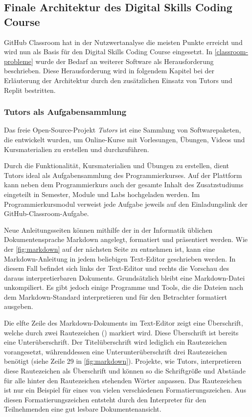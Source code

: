 \subsection{Finale Architektur des Digital Skills Coding Course}
GitHub Classroom hat in der Nutzwertanalyse die meisten Punkte erreicht und wird
nun als Basis für den Digital Skills Coding Course eingesetzt. In
\autoref{classroom-probleme} wurde der Bedarf an weiterer Software als
Herausforderung beschrieben. Diese Herausforderung wird in folgendem Kapitel
bei der Erläuterung der Architektur durch den zusätzlichen Einsatz von Tutors
und Replit bestritten.

\subsubsection{Tutors als Aufgabensammlung}\label{finale-architektur-tutors}
Das freie Open-Source-Projekt \emph{Tutors} ist eine Sammlung von
Softwarepaketen, die entwickelt wurden, um Online-Kurse mit Vorlesungen,
Übungen, Videos und Kursmaterialien zu erstellen und durchzuführen.
\parencite{tutors}

Durch die Funktionalität, Kursmaterialien und Übungen zu erstellen, dient Tutors
ideal als Aufgabensammlung des Programmierkurses. Auf der Plattform kann neben
dem Programmierkurs auch der gesamte Inhalt des Zusatzstudiums eingeteilt in
Semester, Module und Labs hochgeladen werden. Im Programmierkursmodul verweist
jede Aufgabe jeweils auf den Einladungslink der GitHub-Classroom-Aufgabe.

Neue Anleitungsseiten können mithilfe der in der Informatik üblichen
Dokumentensprache Markdown angelegt, formatiert und präsentiert werden. Wie der
\autoref{fig:markdown} auf der nächsten Seite zu entnehmen ist, kann eine 
Markdown-Anleitung in jedem beliebigen Text-Editor geschrieben werden. In diesem
Fall befindet sich links der Text-Editor und rechts die Vorschau des daraus 
interpretierbaren Dokuments. Grundsätzlich bleibt eine Markdown-Datei
unkompiliert. Es gibt jedoch einige Programme und Tools, die die Dateien nach
dem Markdown-Standard interpretieren und für den Betrachter formatiert ausgeben.

Die elfte Zeile des Markdown-Dokuments im Text-Editor zeigt eine Überschrift,
welche durch zwei Rautezeichen (\code{\#\#}) markiert wird. Diese Überschrift
ist bereits eine Unterüberschrift. Der Titelüberschrift wird lediglich ein
Rautezeichen vorangesetzt, währenddessen eine Unterunterüberschrift drei
Rautezeichen benötigt (siehe Zeile 29 in \autoref{fig:markdown}). Projekte,
wie Tutors, interpretieren diese Rautezeichen als Überschrift und können so die 
Schriftgröße und Abstände für alle hinter den Rautezeichen stehenden Wörter
anpassen. Das Rautezeichen ist nur ein Beispiel für eines von vielen
verschiedenen Formatierungszeichen. Aus diesen Formatierungszeichen entsteht
durch den Interpreter für den Teilnehmenden eine gut lesbare Dokumentenansicht.
\parencite{markdown}

